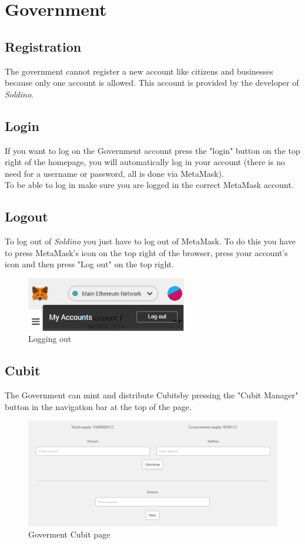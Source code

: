 \section{Government}
	\subsection{Registration}
	The government cannot register a new account like citizens and 
	businesses because only one account is allowed. This account is provided 
	by the developer of \textit{Soldino}.
	\subsection{Login}
	If you want to log on the Government account press the "login" button on the 
	top right of the homepage, you will automatically log in your account 
	(there is no need for a username or password, all is done via MetaMask). 
	\\To be able to log in make sure you are logged in the correct MetaMask\glosp 
	account.
	\subsection{Logout}
	To log out of \textit{Soldino} you just have to log out of 
	MetaMask\glosp. To do this you have to press MetaMask's icon on the top 
	right of the browser, press your account's icon and then press "Log out"
	on the top right.
	\begin{figure}[H]
		\includegraphics[width=7cm]{res/images/logout_metamask.png}
		\centering
		\caption{Logging out}
	\end{figure}
	\subsection{Cubit}
	The Government can mint and distribute Cubits\glosp by pressing the "Cubit 
	Manager" button in the navigation bar at the top of the page.
	\begin{figure}[H]
		\includegraphics[width=15cm]{res/images/cubit_mint.png}
		\centering
		\caption{Goverment Cubit page}
	\end{figure}
